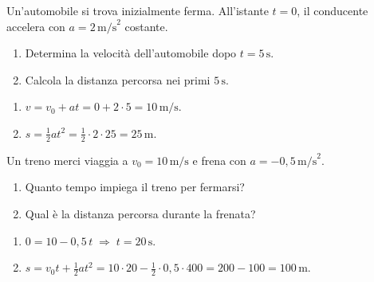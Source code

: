 \begin{question}[ID=1.1, subtitle={Automobile in accelerazione da fermo}, tags={mua, legge oraria}, difficulty=facile]
Un'automobile si trova inizialmente ferma. All'istante $t = 0$, il conducente accelera con $a = 2 \, \text{m/s}^2$ costante.
\begin{enumerate}
    \item Determina la velocità dell'automobile dopo $t = 5 \, \text{s}$.
    \item Calcola la distanza percorsa nei primi $5 \, \text{s}$.
\end{enumerate}
\begin{solution}
    \begin{enumerate}
        \item $v = v_0 + at = 0 + 2 \cdot 5 = 10 \, \text{m/s}$.
        \item $s = \tfrac{1}{2}at^2 = \tfrac{1}{2} \cdot 2 \cdot 25 = 25 \, \text{m}$.
    \end{enumerate}
\end{solution}
\end{question}


\begin{question}[ID=1.2, subtitle={Treno merci in frenata uniforme}, tags={mua, frenata}, difficulty=facile]
Un treno merci viaggia a $v_0 = 10 \, \text{m/s}$ e frena con $a = -0{,}5 \, \text{m/s}^2$.
\begin{enumerate}
    \item Quanto tempo impiega il treno per fermarsi?
    \item Qual è la distanza percorsa durante la frenata?
\end{enumerate}
\begin{solution}
    \begin{enumerate}
        \item $0 = 10 - 0{,}5\,t \;\Rightarrow\; t = 20 \, \text{s}$.
        \item $s = v_0 t + \tfrac{1}{2}at^2 = 10 \cdot 20 - \tfrac{1}{2} \cdot 0{,}5 \cdot 400 = 200 - 100 = 100 \, \text{m}$.
    \end{enumerate}
\end{solution}
\end{question}

